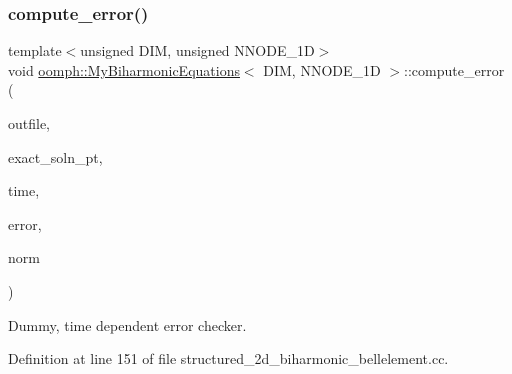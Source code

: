 \subsubsection{\texorpdfstring{compute\+\_\+error()}{compute\_error()}\hspace{0.1cm}{\footnotesize\ttfamily [2/2]}}
{\footnotesize\ttfamily template$<$unsigned D\+IM, unsigned N\+N\+O\+D\+E\+\_\+1D$>$ \\
void \hyperlink{classoomph_1_1MyBiharmonicEquations}{oomph\+::\+My\+Biharmonic\+Equations}$<$ D\+IM, N\+N\+O\+D\+E\+\_\+1D $>$\+::compute\+\_\+error (\begin{DoxyParamCaption}\item[{std\+::ostream \&}]{outfile,  }\item[{Finite\+Element\+::\+Unsteady\+Exact\+Solution\+Fct\+Pt}]{exact\+\_\+soln\+\_\+pt,  }\item[{const double \&}]{time,  }\item[{double \&}]{error,  }\item[{double \&}]{norm }\end{DoxyParamCaption})\hspace{0.3cm}{\ttfamily [inline]}}



Dummy, time dependent error checker. 



Definition at line 151 of file structured\+\_\+2d\+\_\+biharmonic\+\_\+bellelement.\+cc.

\mbox{\label{classoomph_1_1MyBiharmonicEquations_a85687f39c0fb72f25ce67f5867a83470}} 
